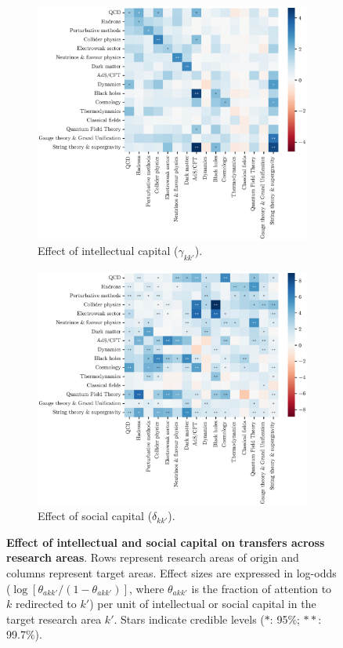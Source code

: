 \documentclass{article}
\begin{document}
\begin{figure}[h]
\hspace{-2em}
\begin{subfigure}{.5\textwidth}
    \includegraphics[width=1\textwidth]{plots/Fig7a.eps}
    \caption{Effect of intellectual capital ($\gamma_{kk'}$).}
    \label{fig:intellectual-capital-effect}
\end{subfigure}%
\begin{subfigure}{.5\textwidth}
    \includegraphics[width=1\textwidth]{plots/Fig7b.eps}
    \caption{Effect of social capital ($\delta_{kk'}$).}
    \label{fig:social-capital-effect}
\end{subfigure}
\caption{\textbf{Effect of intellectual and social capital on transfers across research areas}. Rows represent research areas of origin and columns represent target areas. Effect sizes are expressed in log-odds ($\log {[\theta_{akk'}/(1-\theta_{akk'})]}$, where $\theta_{akk'}$ is the fraction of attention to $k$ redirected to $k'$) per unit of intellectual or social capital in the target research area $k'$. Stars indicate credible levels ($\ast$: 95\%; $\ast\ast$: 99.7\%).}
\label{fig:test}
\end{figure}
\end{document}
